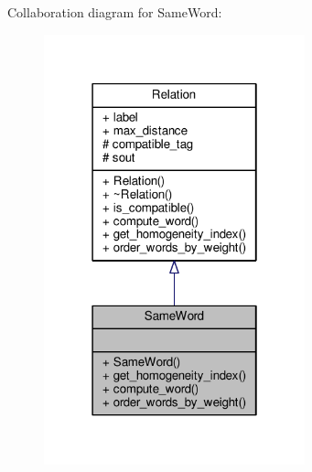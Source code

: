 Collaboration diagram for Same\+Word\+:\nopagebreak
\begin{figure}[H]
\begin{center}
\leavevmode
\includegraphics[width=214pt]{classSameWord__coll__graph}
\end{center}
\end{figure}
